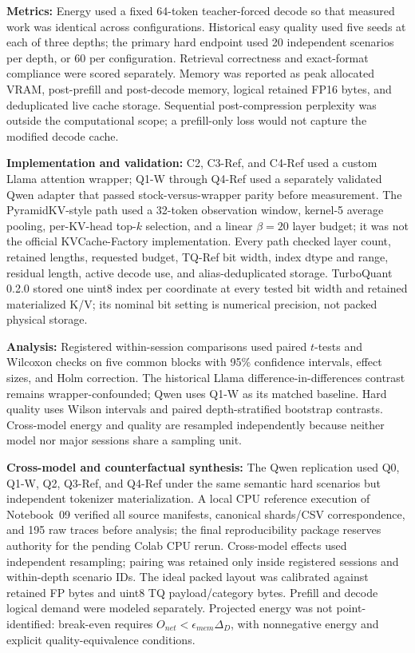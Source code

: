 \documentclass[conference]{IEEEtran}
\begin{document}
\textbf{Metrics:} Energy used a fixed 64-token teacher-forced decode so that measured work was identical across configurations. Historical easy quality used five seeds at each of three depths; the primary hard endpoint used 20 independent scenarios per depth, or 60 per configuration. Retrieval correctness and exact-format compliance were scored separately. Memory was reported as peak allocated VRAM, post-prefill and post-decode memory, logical retained FP16 bytes, and deduplicated live cache storage. Sequential post-compression perplexity was outside the computational scope; a prefill-only loss would not capture the modified decode cache.

\textbf{Implementation and validation:} C2, C3-Ref, and C4-Ref used a custom Llama attention wrapper; Q1-W through Q4-Ref used a separately validated Qwen adapter that passed stock-versus-wrapper parity before measurement. The PyramidKV-style path used a 32-token observation window, kernel-5 average pooling, per-KV-head top-$k$ selection, and a linear $\beta=20$ layer budget; it was not the official KVCache-Factory implementation. Every path checked layer count, retained lengths, requested budget, TQ-Ref bit width, index dtype and range, residual length, active decode use, and alias-deduplicated storage. TurboQuant 0.2.0 stored one uint8 index per coordinate at every tested bit width and retained materialized K/V; its nominal bit setting is numerical precision, not packed physical storage.

\textbf{Analysis:} Registered within-session comparisons used paired $t$-tests and Wilcoxon checks on five common blocks with 95\% confidence intervals, effect sizes, and Holm correction. The historical Llama difference-in-differences contrast remains wrapper-confounded; Qwen uses Q1-W as its matched baseline. Hard quality uses Wilson intervals and paired depth-stratified bootstrap contrasts. Cross-model energy and quality are resampled independently because neither model nor major sessions share a sampling unit.

\textbf{Cross-model and counterfactual synthesis:} The Qwen replication used Q0, Q1-W, Q2, Q3-Ref, and Q4-Ref under the same semantic hard scenarios but independent tokenizer materialization. A local CPU reference execution of Notebook~09 verified all source manifests, canonical shards/CSV correspondence, and 195 raw traces before analysis; the final reproducibility package reserves authority for the pending Colab CPU rerun. Cross-model effects used independent resampling; pairing was retained only inside registered sessions and within-depth scenario IDs. The ideal packed layout was calibrated against retained FP bytes and uint8 TQ payload/category bytes. Prefill and decode logical demand were modeled separately. Projected energy was not point-identified: break-even requires $O_{net}<\epsilon_{mem}\Delta_D$, with nonnegative energy and explicit quality-equivalence conditions.
\end{document}

